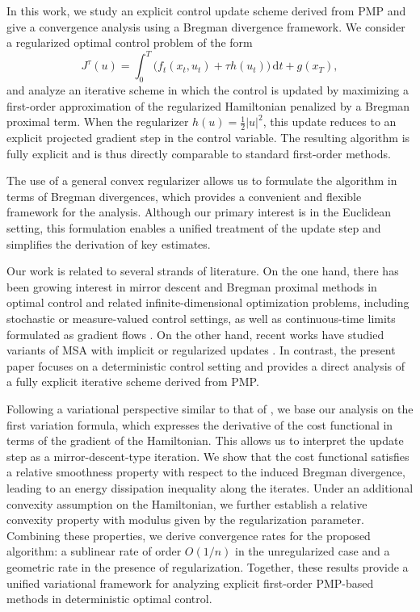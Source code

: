\documentclass[11pt]{amsart}
\theoremstyle{plain}
\theoremstyle{definition}
\theoremstyle{remark}
\newcommand{\dd}{\,\mathrm{d}}
\begin{document}
In this work, we study an explicit control update scheme derived from PMP and give a convergence analysis using a Bregman divergence framework. We consider a regularized optimal control problem of the form
\[
J^\tau(u) = \int_0^T \big(f_t(x_t,u_t) + \tau h(u_t)\big)\dd t + g(x_T),
\]
and analyze an iterative scheme in which the control is updated by maximizing a first-order approximation of the regularized Hamiltonian penalized by a Bregman proximal term. When the regularizer $h(u) = \tfrac{1}{2}|u|^2$, this update reduces to an explicit projected gradient step in the control variable. The resulting algorithm is fully explicit and is thus directly comparable to standard first-order methods.

The use of a general convex regularizer allows us to formulate the algorithm in terms of Bregman divergences, which provides a convenient and flexible framework for the analysis. Although our primary interest is in the Euclidean setting, this formulation enables a unified treatment of the update step and simplifies the derivation of key estimates.

Our work is related to several strands of literature. On the one hand, there has been growing interest in mirror descent and Bregman proximal methods in optimal control and related infinite-dimensional optimization problems, including stochastic or measure-valued control settings, as well as continuous-time limits formulated as gradient flows \cite{reisinger2023linear,kerimkulov2025mirror,sethi2025mirror}. On the other hand, recent works have studied variants of MSA with implicit or regularized updates \cite{kerimkulov2021modified,sethi2024modified}. In contrast, the present paper focuses on a deterministic control setting and provides a direct analysis of a fully explicit iterative scheme derived from PMP.

Following a variational perspective similar to that of \cite{kerimkulov2025mirror}, we base our analysis on the first variation formula, which expresses the derivative of the cost functional in terms of the gradient of the Hamiltonian. This allows us to interpret the update step as a mirror-descent-type iteration. We show that the cost functional satisfies a relative smoothness property with respect to the induced Bregman divergence, leading to an energy dissipation inequality along the iterates. Under an additional convexity assumption on the Hamiltonian, we further establish a relative convexity property with modulus given by the regularization parameter. Combining these properties, we derive convergence rates for the proposed algorithm: a sublinear rate of order $O(1/n)$ in the unregularized case and a geometric rate in the presence of regularization. Together, these results provide a unified variational framework for analyzing explicit first-order PMP-based methods in deterministic optimal control.
\end{document}
